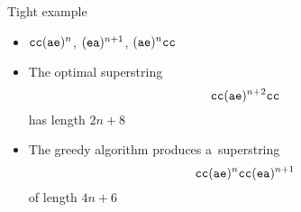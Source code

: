 %

\begin{frame}[label=tight]{Tight example}
\begin{itemize}[<+->]
\item ${\tt cc}({\tt ae})^n$, $({\tt ea})^{n+1}$, $ ({\tt ae})^n{\tt cc}$
\item The optimal superstring \[{\tt cc}({\tt ae})^{n+2}{\tt cc}\] has length $2n+8$
\item The greedy algorithm produces a~superstring \[{\tt cc}({\tt ae})^n{\tt cc}({\tt ea})^{n+1}\] of length $4n+6$
\end{itemize}
\end{frame}


